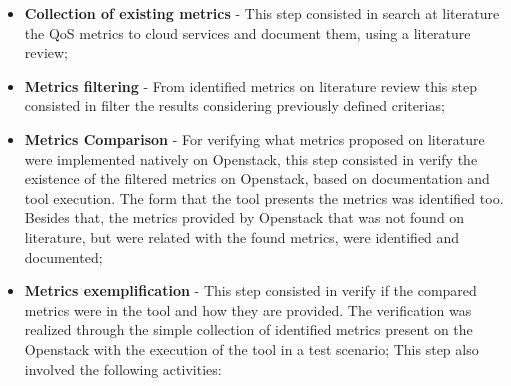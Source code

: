 \documentclass[conference]{IEEEtran}
\begin{document}
\begin{itemize}
 
 \item \textbf{Collection of existing metrics} - This step consisted in search at literature the QoS metrics to cloud services and document them, using a literature review;

  
 \item \textbf{Metrics filtering} - From identified metrics on literature review this step consisted in
 filter the results considering previously defined criterias;



  \item \textbf{Metrics Comparison} - For verifying what metrics proposed on literature were implemented natively
  on Openstack, this step consisted in verify the existence of the filtered metrics on Openstack, based on documentation and tool execution. The form that the tool presents the metrics was identified too. Besides that, the metrics provided by Openstack that was not found on literature, but were related with the found metrics, were identified and documented;
 
 \item \textbf{Metrics exemplification} - This step consisted in verify if the compared metrics were in
 the tool and how they are provided. The verification was realized through the simple collection of identified metrics present on the Openstack with the execution of the tool in a test scenario;
 This step also involved the following activities:


\end{itemize}
\end{document}
